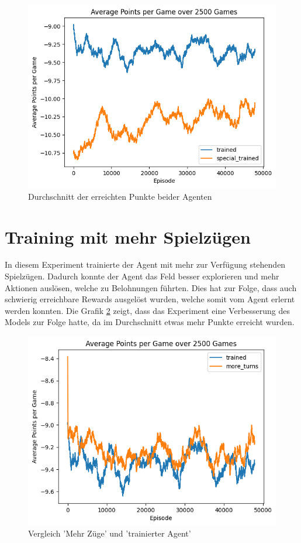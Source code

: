 \begin{figure}[!h]
    \centering
    \includegraphics[scale=0.6]{Bilder/points_special_trained.png}
    \caption{Durchschnitt der erreichten Punkte beider Agenten}
    \label{fig:special_points}
\end{figure}

 \newpage
\section{Training mit mehr Spielzügen}

In diesem Experiment trainierte der Agent mit mehr zur Verfügung stehenden Spielzügen. Dadurch konnte der Agent das Feld besser explorieren und mehr Aktionen auslösen, welche zu Belohnungen führten. Dies hat zur Folge, dass auch schwierig erreichbare Rewards ausgelöst wurden, welche somit vom Agent erlernt werden konnten. 
Die Grafik \ref{fig:turns_points} zeigt, dass das Experiment eine Verbesserung des Models zur Folge hatte, da im Durchschnitt etwas mehr Punkte erreicht wurden.

\begin{figure}[!h]
    \centering
    \includegraphics[scale=0.6]{Bilder/points_more_turns.png}
    \caption{Vergleich 'Mehr Züge' und 'trainierter Agent'}
    \label{fig:turns_points}

\end{figure}

